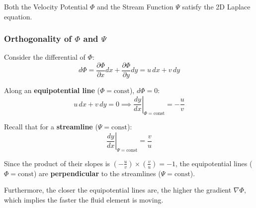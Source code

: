 \begin{resultbox}
Both the Velocity Potential $\Phi$ and the Stream Function $\Psi$ satisfy the 2D Laplace equation.
\end{resultbox}
\newpage
\subsubsection{Orthogonality of $\Phi$ and $\Psi$}

Consider the differential of $\Phi$:
\begin{equation}
    d\Phi = \frac{\partial \Phi}{\partial x}dx + \frac{\partial \Phi}{\partial y}dy = u\,dx + v\,dy
\end{equation}

Along an \textbf{equipotential line} ($\Phi = \text{const}$), $d\Phi = 0$:
\begin{equation}
    u\,dx + v\,dy = 0 \implies \left.\frac{dy}{dx}\right|_{\Phi = \text{const}} = -\frac{u}{v}
\end{equation}

Recall that for a \textbf{streamline} ($\Psi = \text{const}$):
\begin{equation}
    \left.\frac{dy}{dx}\right|_{\Psi = \text{const}} = \frac{v}{u}
\end{equation}

Since the product of their slopes is $\left(-\frac{u}{v}\right) \times \left(\frac{v}{u}\right) = -1$, the equipotential lines ($\Phi = \text{const}$) are \textbf{perpendicular} to the streamlines ($\Psi = \text{const}$).

Furthermore, the closer the equipotential lines are, the higher the gradient $\nabla \Phi$, which implies the faster the fluid element is moving.
\vspace{16pt}

\begin{center}

\end{center}

